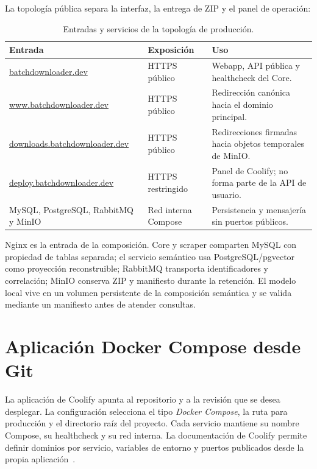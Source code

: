 La topología pública separa la interfaz, la entrega de ZIP y el panel de operación:

\begin{table}[H]
\centering
\small
\begin{tabularx}{\textwidth}{p{}p{}X}
\toprule
\textbf{Entrada} & \textbf{Exposición} & \textbf{Uso}\\
\midrule
\url{batchdownloader.dev} & HTTPS público & Webapp, API pública y healthcheck del Core.\\
\url{www.batchdownloader.dev} & HTTPS público & Redirección canónica hacia el dominio principal.\\
\url{downloads.batchdownloader.dev} & HTTPS público & Redirecciones firmadas hacia objetos temporales de MinIO.\\
\url{deploy.batchdownloader.dev} & HTTPS restringido & Panel de Coolify; no forma parte de la API de usuario.\\
MySQL, PostgreSQL, RabbitMQ y MinIO & Red interna Compose & Persistencia y mensajería sin puertos públicos.\\
\bottomrule
\end{tabularx}
\caption{Entradas y servicios de la topología de producción.}
\label{tabla:coolify-topologia}
\end{table}

Nginx es la entrada de la composición. Core y scraper comparten MySQL con propiedad de tablas separada; el servicio semántico usa PostgreSQL/pgvector como proyección reconstruible; RabbitMQ transporta identificadores y correlación; MinIO conserva ZIP y manifiesto durante la retención. El modelo local vive en un volumen persistente de la composición semántica y se valida mediante un manifiesto antes de atender consultas.

\section{Aplicación Docker Compose desde Git}

La aplicación de Coolify apunta al repositorio y a la revisión que se desea desplegar. La configuración selecciona el tipo \emph{Docker Compose}, la ruta  para producción y el directorio raíz del proyecto. Cada servicio mantiene su nombre Compose, su healthcheck y su red interna. La documentación de Coolify permite definir dominios por servicio, variables de entorno y puertos publicados desde la propia aplicación~\cite{coolifyDockerCompose}.

